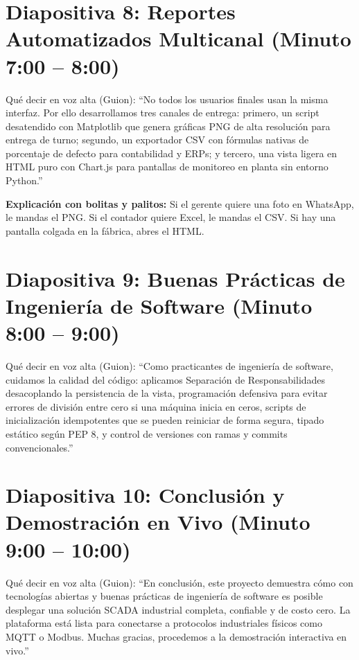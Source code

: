 \documentclass[10pt,letterpaper]{article}
\begin{document}
\section*{Diapositiva 8: Reportes Automatizados Multicanal (Minuto 7:00 -- 8:00)}
\begin{guionbox}{Qué decir en voz alta (Guion):}
``No todos los usuarios finales usan la misma interfaz. Por ello desarrollamos tres canales de entrega: primero, un script desatendido con Matplotlib que genera gráficas PNG de alta resolución para entrega de turno; segundo, un exportador CSV con fórmulas nativas de porcentaje de defecto para contabilidad y ERPs; y tercero, una vista ligera en HTML puro con Chart.js para pantallas de monitoreo en planta sin entorno Python.''
\end{guionbox}
\textbf{Explicación con bolitas y palitos:} Si el gerente quiere una foto en WhatsApp, le mandas el PNG. Si el contador quiere Excel, le mandas el CSV. Si hay una pantalla colgada en la fábrica, abres el HTML.

\section*{Diapositiva 9: Buenas Prácticas de Ingeniería de Software (Minuto 8:00 -- 9:00)}
\begin{guionbox}{Qué decir en voz alta (Guion):}
``Como practicantes de ingeniería de software, cuidamos la calidad del código: aplicamos Separación de Responsabilidades desacoplando la persistencia de la vista, programación defensiva para evitar errores de división entre cero si una máquina inicia en ceros, scripts de inicialización idempotentes que se pueden reiniciar de forma segura, tipado estático según PEP 8, y control de versiones con ramas y commits convencionales.''
\end{guionbox}

\section*{Diapositiva 10: Conclusión y Demostración en Vivo (Minuto 9:00 -- 10:00)}
\begin{guionbox}{Qué decir en voz alta (Guion):}
``En conclusión, este proyecto demuestra cómo con tecnologías abiertas y buenas prácticas de ingeniería de software es posible desplegar una solución SCADA industrial completa, confiable y de costo cero. La plataforma está lista para conectarse a protocolos industriales físicos como MQTT o Modbus. Muchas gracias, procedemos a la demostración interactiva en vivo.''
\end{guionbox}
\end{document}
